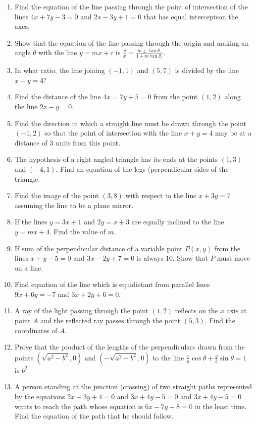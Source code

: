 \documentclass{article}
\theoremstyle{remark}
\begin{document}
\begin{enumerate}
\item Find the equation of the line passing through the point of intersection of the lines $4x+7y-3=0$ and $2x-3y+1=0$ that has equal interceptson the axes.
\item Show that the equation of the line passing through the origin and making an angle $\theta$ with the line $y=mx+c$ is $\frac{y}{x}=\frac{m \pm \tan \theta,}{1 \mp m\tan \theta,}$.
\item In what ratio, the line joining $(-1,1)$ and $(5,7)$ is divided by the line $x+y=4$?
\item Find the distance of the line $4x=7y+5=0$ from the point $(1,2)$ along the line $2x-y=0$.
\item Find the direction in which a straight line must be  drawn through the point $(-1,2)$ so that the point of intersection with the line $x+y=4$ may be at a distance of $3$ units from this point.
\item The hypothesis of a right angled triangle has its ends at the points $(1,3)$ and $(-4,1)$. Find an equation of the legs (perpendicular sides of the triangle.
\item Find the image of the point $(3,8)$ with respect to the line $x+3y=7$ assuming the line to be a plane mirror.
\item If the lines $y= 3x+1$ and $2y= x+3$ are equally inclined to the line $y= mx+4$. Find the value of $m$.
\item If sum of the perpendicular distance of a variable point $P(x,y)$ from the lines $x+y-5=0$ and $3x-2y+7=0$ is always $10$. Show that $P$ must move on a line.
\item Find equation of the line which is equidistant from parallel lines $9x+6y=-7$ and $3x+2y+6=0$.
\item A ray of the light passing through the point $(1,2)$ reflects on the $x$ axis at point $A$ and the reflected ray passes through the point $(5,3)$. Find the coordinates of $A$.
\item Prove that the product of the lengths of the perpendiculars drawn from the points $(\sqrt{a^2-b^2}, 0)$ and $(-\sqrt{a^2-b^2}, 0)$ to the line $\frac{x}{a} \cos \theta + \frac{y}{b} \sin \theta = 1$ is $b^2$
\item A person standing at the junction (crossing) of two straight paths represented by the equations $2x-3y+4=0$ and $3x+4y-5 = 0$ and $3x+4y-5= 0 $ wants to reach the path whose equation is $6x-7y+8=0$ in the least time. Find the equation of the path that he should follow.
\end{enumerate}
\end{document}

